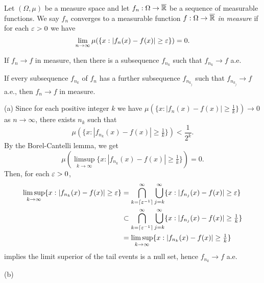 \documentclass{../../large}
\begin{document}
\begin{prb}
Let $(\Omega,\mu)$ be a measure space and let $f_n:\Omega\to\overline{\mathbb{R}}$ be a sequence of measurable functions.
We say $f_n$ converges to a measurable function $f:\Omega\to\overline{\mathbb{R}}$ \emph{in measure} if for each $\varepsilon>0$ we have
\[\lim_{n\to\infty}\mu(\{x:|f_n(x)-f(x)|\ge\varepsilon\})=0.\]
\begin{parts}
\item If $f_n\to f$ in measure, then there is a subsequence $f_{n_k}$ such that $f_{n_k}\to f$ a.e.
\item If every subsequence $f_{n_k}$ of $f_n$ has a further subsequence $f_{n_{k_j}}$ such that $f_{n_{k_j}}\to f$ a.e., then $f_n\to f$ in measure.
\end{parts}
\end{prb}
\begin{pf}
(a)
Since for each positive integer $k$ we have $\mu(\{x:|f_n(x)-f(x)|\ge\frac1k\})\to0$ as $n\to\infty$, there exists $n_k$ such that
\[\mu(\{x:|f_{n_k}(x)-f(x)|\ge\tfrac1k\})<\frac1{2^k}.\]
By the Borel-Cantelli lemma, we get
\[\mu(\limsup_{k\to\infty}\{x:|f_{n_k}(x)-f(x)|\ge\tfrac1k\})=0.\]
Then, for each $\varepsilon>0$,
\begin{align*}
\limsup_{k\to\infty}\{x:|f_{n_k}(x)-f(x)|\ge\varepsilon\}
&=\bigcap_{k=\lceil\varepsilon^{-1}\rceil}^\infty\bigcup_{j=k}^\infty\{x:|f_{n_j}(x)-f(x)|\ge\varepsilon\}\\
&\subset\bigcap_{k=\lceil\varepsilon^{-1}\rceil}^\infty\bigcup_{j=k}^\infty\{x:|f_{n_j}(x)-f(x)|\ge\tfrac1k\}\\
&=\limsup_{k\to\infty}\{x:|f_{n_k}(x)-f(x)|\ge\tfrac1k\}
\end{align*}
implies the limit superior of the tail events is a null set, hence $f_{n_k}\to f$ a.e.

(b)
\end{pf}
\end{document}
